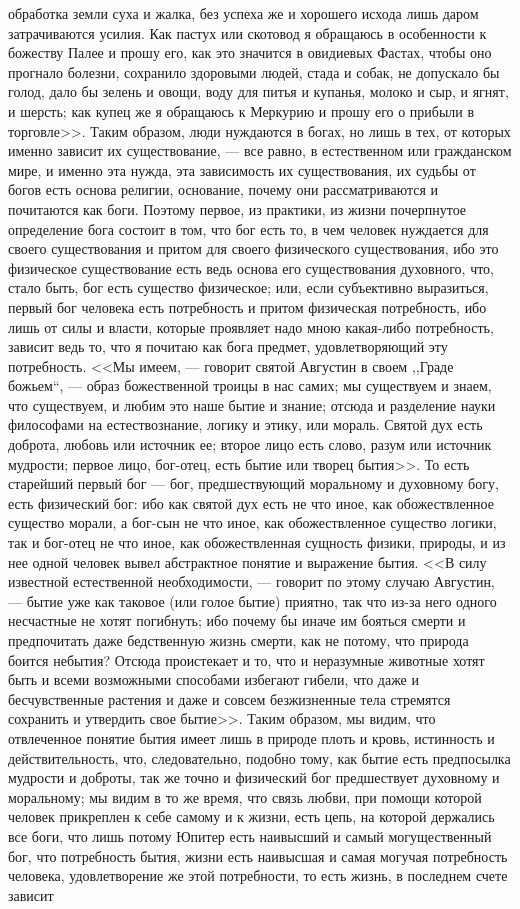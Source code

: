 \documentclass[12pt]{article}
\begin{document}
обработка земли суха и жалка, без успеха же и хорошего исхода лишь даром затрачиваются усилия. Как пастух или скотовод я обращаюсь в особенности к божеству Палее и прошу его, как это значится в овидиевых Фастах, чтобы оно прогнало болезни, сохранило здоровыми людей, стада и собак, не допускало бы голод, дало бы зелень и овощи, воду для питья и купанья, молоко и сыр, и ягнят, и шерсть; как купец же я обращаюсь к Меркурию и прошу его о прибыли в торговле>>. Таким образом, люди нуждаются в богах, но лишь в тех, от которых именно зависит их существование, --- все равно, в естественном или гражданском мире, и именно эта нужда, эта зависимость их существования, их судьбы от богов есть основа религии, основание, почему они рассматриваются и почитаются как боги. Поэтому первое, из практики, из жизни почерпнутое определение бога состоит в том, что бог есть то, в чем человек нуждается для своего существования и притом для своего физического существования, ибо это физическое существование есть ведь основа его существования духовного, что, стало быть, бог есть существо физическое; или, если субъективно выразиться, первый бог человека есть потребность и притом физическая потребность, ибо лишь от силы и власти, которые проявляет надо мною какая-либо потребность, зависит ведь то, что я почитаю как бога предмет, удовлетворяющий эту потребность. <<Мы имеем, --- говорит святой Августин в своем ,,Граде божьем``,  --- образ божественной троицы в нас самих; мы существуем и знаем, что существуем, и любим это наше бытие и знание; отсюда и разделение науки философами на естествознание, логику и этику, или мораль. Святой дух есть доброта, любовь или источник ее; второе лицо есть слово, разум или источник мудрости; первое лицо, бог-отец, есть бытие или творец бытия>>. То есть старейший первый бог --- бог, предшествующий моральному и духовному богу, есть физический бог: ибо как святой дух есть не что иное, как обожествленное существо морали, а бог-сын не что иное, как обожествленное существо логики, так и бог-отец не что иное, как обожествленная сущность физики, природы, и из нее одной человек вывел абстрактное понятие и выражение бытия. <<В силу известной естественной необходимости, --- говорит по этому случаю Августин, --- бытие уже как таковое (или голое бытие) приятно, так что из-за него одного несчастные не хотят погибнуть; ибо почему бы иначе им бояться смерти и предпочитать даже бедственную жизнь смерти, как не потому, что природа боится небытия? Отсюда проистекает и то, что и неразумные животные хотят быть и всеми возможными способами избегают гибели, что даже и бесчувственные растения и даже и совсем безжизненные тела стремятся сохранить и утвердить свое бытие>>. Таким образом, мы видим, что отвлеченное понятие бытия имеет лишь в природе плоть и кровь, истинность и действительность, что, следовательно, подобно тому, как бытие есть предпосылка мудрости и доброты, так же точно и физический бог предшествует духовному и моральному; мы видим в то же время, что связь любви, при помощи которой человек прикреплен к себе самому и к жизни, есть цепь, на которой держались все боги, что лишь потому Юпитер есть наивысший и самый могущественный бог, что потребность бытия, жизни есть наивысшая и самая могучая потребность человека, удовлетворение же этой потребности, то есть жизнь, в последнем счете зависит 
\end{document}
